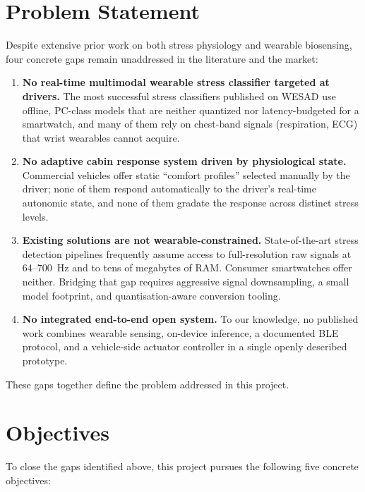 \section{Problem Statement}
\label{sec:problem}

Despite extensive prior work on both stress physiology and wearable
biosensing, four concrete gaps remain unaddressed in the literature
and the market:

\begin{enumerate}
  \item \textbf{No real-time multimodal wearable stress classifier
  targeted at drivers.} The most successful stress classifiers
  published on WESAD use offline, PC-class models that are neither
  quantized nor latency-budgeted for a smartwatch, and many of them
  rely on chest-band signals (respiration, ECG) that wrist wearables
  cannot acquire.

  \item \textbf{No adaptive cabin response system driven by
  physiological state.} Commercial vehicles offer static ``comfort
  profiles'' selected manually by the driver; none of them respond
  automatically to the driver's real-time autonomic state, and none
  of them gradate the response across distinct stress levels.

  \item \textbf{Existing solutions are not wearable-constrained.}
  State-of-the-art stress detection pipelines frequently assume access
  to full-resolution raw signals at 64--700~Hz and to tens of megabytes
  of RAM. Consumer smartwatches offer neither. Bridging that gap
  requires aggressive signal downsampling, a small model footprint,
  and quantisation-aware conversion tooling.

  \item \textbf{No integrated end-to-end open system.} To our
  knowledge, no published work combines wearable sensing, on-device
  inference, a documented BLE protocol, and a vehicle-side actuator
  controller in a single openly described prototype.
\end{enumerate}

These gaps together define the problem addressed in this project.

\section{Objectives}
\label{sec:objectives}

To close the gaps identified above, this project pursues the
following five concrete objectives:

